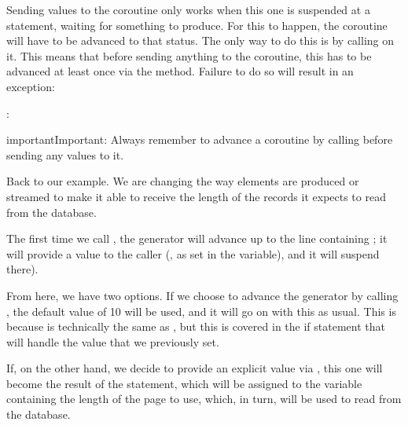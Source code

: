 \documentclass[a4paper,10pt,english]{sphinxmanual}
\begin{document}
Sending values to the coroutine only works when this one is suspended at a 
statement, waiting for something to produce. For this to happen, the coroutine will have to
be advanced to that status. The only way to do this is by calling  on it. This means
that before sending anything to the coroutine, this has to be advanced at least once via the
 method. Failure to do so will result in an exception:

\begin{sphinxVerbatim}[commandchars=\\\{\}]
  
: 
\end{sphinxVerbatim}

\begin{sphinxadmonition}{important}{Important:}
Always remember to advance a coroutine by calling  before sending any values to it.
\end{sphinxadmonition}

Back to our example. We are changing the way elements are produced or streamed to make
it able to receive the length of the records it expects to read from the database.

The first time we call , the generator will advance up to the line containing ; it
will provide a value to the caller (, as set in the variable), and it will suspend there).

From here, we have two options. If we choose to advance the generator by calling ,
the default value of 10 will be used, and it will go on with this as usual. This is because
 is technically the same as , but this is covered in the if statement that
will handle the value that we previously set.

If, on the other hand, we decide to provide an explicit value via , this one
will become the result of the  statement, which will be assigned to the variable
containing the length of the page to use, which, in turn, will be used to read from the
database.
\end{document}
